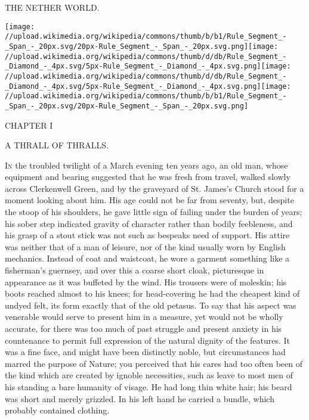 {}

{THE NETHER WORLD.}

\texttt{[image: //upload.wikimedia.org/wikipedia/commons/thumb/b/b1/Rule\_Segment\_-\_Span\_-\_20px.svg/20px-Rule\_Segment\_-\_Span\_-\_20px.svg.png]}\texttt{[image: //upload.wikimedia.org/wikipedia/commons/thumb/d/db/Rule\_Segment\_-\_Diamond\_-\_4px.svg/5px-Rule\_Segment\_-\_Diamond\_-\_4px.svg.png]}\texttt{[image: //upload.wikimedia.org/wikipedia/commons/thumb/d/db/Rule\_Segment\_-\_Diamond\_-\_4px.svg/5px-Rule\_Segment\_-\_Diamond\_-\_4px.svg.png]}\texttt{[image: //upload.wikimedia.org/wikipedia/commons/thumb/b/b1/Rule\_Segment\_-\_Span\_-\_20px.svg/20px-Rule\_Segment\_-\_Span\_-\_20px.svg.png]}

{CHAPTER I}

A THRALL OF THRALLS.

\textsc{In} the troubled twilight of a March evening ten years ago, an
old man, whose equipment and bearing suggested that he was fresh from
travel, walked slowly across Clerkenwell Green, and by the graveyard of
St. James's Church stood for a moment looking about him. His age could
not be far from seventy, but, despite the stoop of his shoulders, he
gave little sign of failing under the burden of years; his sober step
indicated gravity of character rather than bodily feebleness, and his
grasp of a stout stick was not such as bespeaks need of support. His
attire was neither that of a man of leisure, nor of the kind usually
worn by English {}mechanics. Instead of coat and waistcoat, he wore a
garment something like a fisherman's guernsey, and over this a coarse
short cloak, picturesque in appearance as it was buffeted by the wind.
His trousers were of moleskin; his boots reached almost to his knees;
for head-covering he had the cheapest kind of undyed felt, its form
exactly that of the old petasus. To say that his aspect was venerable
would serve to present him in a measure, yet would not be wholly
accurate, for there was too much of past struggle and present anxiety in
his countenance to permit full expression of the natural dignity of the
features. It was a fine face, and might have been distinctly noble, but
circumstances had marred the purpose of Nature; you perceived that his
cares had too often been of the kind which are created by ignoble
necessities, such as leave to most men of his standing a bare humanity
of visage. He had long thin white hair; his beard was short and merely
grizzled. In his left hand he carried a bundle, which probably contained
clothing.

